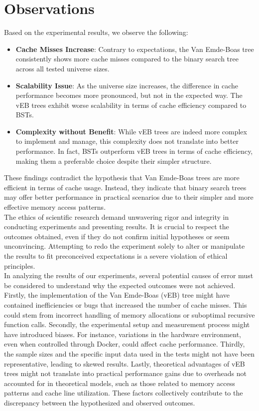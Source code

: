 \newpage
\section{Observations}

Based on the experimental results, we observe the following:

\begin{itemize}
\item \textbf{Cache Misses Increase}: Contrary to expectations, the Van Emde-Boas tree consistently shows more cache misses compared to the binary search tree across all tested universe sizes.
\item \textbf{Scalability Issue}: As the universe size increases, the difference in cache performance becomes more pronounced, but not in the expected way. The vEB trees exhibit worse scalability in terms of cache efficiency compared to BSTs.
\item \textbf{Complexity without Benefit}: While vEB trees are indeed more complex to implement and manage, this complexity does not translate into better performance. In fact, BSTs outperform vEB trees in terms of cache efficiency, making them a preferable choice despite their simpler structure.
\end{itemize}

These findings contradict the hypothesis that Van Emde-Boas trees are more efficient in terms of cache usage. Instead, they indicate that binary search trees may offer better performance in practical scenarios due to their simpler and more effective memory access patterns.\\

The ethics of scientific research demand unwavering rigor and integrity in conducting experiments and presenting results. It is crucial to respect the outcomes obtained, even if they do not confirm initial hypotheses or seem unconvincing. Attempting to redo the experiment solely to alter or manipulate the results to fit preconceived expectations is a severe violation of ethical principles.\\

In analyzing the results of our experiments, several potential causes of error must be considered to understand why the expected outcomes were not achieved. Firstly, the implementation of the Van Emde-Boas (vEB) tree might have contained inefficiencies or bugs that increased the number of cache misses. This could stem from incorrect handling of memory allocations or suboptimal recursive function calls. Secondly, the experimental setup and measurement process might have introduced biases. For instance, variations in the hardware environment, even when controlled through Docker, could affect cache performance. Thirdly, the sample sizes and the specific input data used in the tests might not have been representative, leading to skewed results. Lastly, theoretical advantages of vEB trees might not translate into practical performance gains due to overheads not accounted for in theoretical models, such as those related to memory access patterns and cache line utilization. These factors collectively contribute to the discrepancy between the hypothesized and observed outcomes.